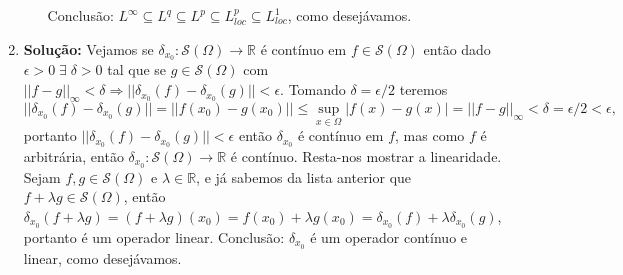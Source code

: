\documentclass{article}
\begin{document}
\begin{enumerate}
\begin{enumerate}
			Conclusão: $L^{\infty} \subseteq L^{q} \subseteq L^{p} \subseteq L^{p}_{loc} \subseteq L^{1}_{loc}$, como desejávamos.
		\end{enumerate}
		
		\item \textbf{Solução:} Vejamos se $\delta_{x_{0}} : \mathcal{S}(\Omega) \to \mathbb{R}$ é contínuo em $f \in \mathcal{S}(\Omega)$ então dado $\epsilon >0 \; \exists \; \delta >0$ tal que se $g \in \mathcal{S}(\Omega)$ com $||f - g||_{\infty} < \delta \Rightarrow ||\delta_{x_0}(f) - \delta_{x_0}(g)|| < \epsilon$. Tomando $\delta = \epsilon/2$ teremos $$
		||\delta_{x_0}(f) - \delta_{x_0}(g)|| = ||f(x_{0}) - g(x_{0})|| \leq \sup_{x \in \Omega}|f(x) -g(x)| = ||f-g||_{\infty} < \delta = \epsilon/2 < \epsilon,
		$$ 
		portanto $||\delta_{x_0}(f) - \delta_{x_0}(g)||<\epsilon$ então $\delta_{x_0}$ é contínuo em $f$, mas como $f$ é arbitrária, então $\delta_{x_{0}} : \mathcal{S}(\Omega) \to \mathbb{R}$ é contínuo. Resta-nos mostrar a linearidade. Sejam $f, g \in \mathcal{S}(\Omega)$ e $\lambda \in \mathbb{R}$, e já sabemos da lista anterior que $f+\lambda g \in \mathcal{S}(\Omega)$, então $\delta_{x_{0}}(f+\lambda g) = (f+\lambda g)(x_{0}) = f(x_{0})+\lambda g(x_{0}) = \delta_{x_{0}}(f) + \lambda \delta_{x_{0}}(g)$, portanto é um operador linear. Conclusão: $\delta_{x_{0}}$ é um operador contínuo e linear, como desejávamos.
		

\end{enumerate}
\end{document}
